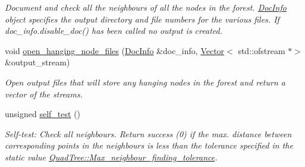 \begin{DoxyCompactItemize}
\begin{DoxyCompactList}\small\item\em Document and check all the neighbours of all the nodes in the forest. \hyperlink{classoomph_1_1DocInfo}{Doc\+Info} object specifies the output directory and file numbers for the various files. If {\ttfamily doc\+\_\+info.\+disable\+\_\+doc()} has been called no output is created. \end{DoxyCompactList}\item 
void \hyperlink{classoomph_1_1QuadTreeForest_a42c02805b4a2307def88d07e5a7c8266}{open\+\_\+hanging\+\_\+node\+\_\+files} (\hyperlink{classoomph_1_1DocInfo}{Doc\+Info} \&doc\+\_\+info, \hyperlink{classoomph_1_1Vector}{Vector}$<$ std\+::ofstream $\ast$$>$ \&output\+\_\+stream)
\begin{DoxyCompactList}\small\item\em Open output files that will store any hanging nodes in the forest and return a vector of the streams. \end{DoxyCompactList}\item 
unsigned \hyperlink{classoomph_1_1QuadTreeForest_a8b5f84f7d478ba7f9d66804c8f7b5783}{self\+\_\+test} ()
\begin{DoxyCompactList}\small\item\em Self-\/test\+: Check all neighbours. Return success (0) if the max. distance between corresponding points in the neighbours is less than the tolerance specified in the static value \hyperlink{classoomph_1_1Tree_aef9abebc166fa3bf81ecb59ec0d5d6b2}{Quad\+Tree\+::\+Max\+\_\+neighbour\+\_\+finding\+\_\+tolerance}. \end{DoxyCompactList}\end{DoxyCompactItemize}
